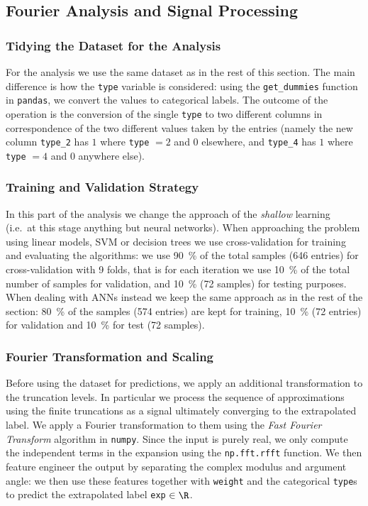 \subsection{Fourier Analysis and Signal Processing}


\subsubsection{Tidying the Dataset for the Analysis}

For the analysis we use the same dataset as in the rest of this section.
The main difference is how the \texttt{type} variable is considered: using the \texttt{get\_dummies} function in \texttt{pandas}, we convert the values to categorical labels.
The outcome of the operation is the conversion of the single \texttt{type} to two different columns in correspondence of the two different values taken by the entries (namely the new column \texttt{type\_2} has $1$ where \texttt{type} $= 2$ and $0$ elsewhere, and \texttt{type\_4} has $1$ where \texttt{type} $= 4$ and $0$ anywhere else).


\subsubsection{Training and Validation Strategy}

In this part of the analysis we change the approach of the \emph{shallow} learning (i.e.\ at this stage anything but neural networks).
When approaching the problem using linear models, SVM or decision trees we use cross-validation for training and evaluating the algorithms: we use \SI{90}{\percent} of the total samples (\num{646} entries) for cross-validation with \num{9} folds, that is for each iteration we use \SI{10}{\percent} of the total number of samples for validation, and \SI{10}{\percent} (\num{72} samples) for testing purposes.
When dealing with ANNs instead we keep the same approach as in the rest of the section: \SI{80}{\percent} of the samples (\num{574} entries) are kept for training, \SI{10}{\percent} (\num{72} entries) for validation and \SI{10}{\percent} for test (\num{72} samples).


\subsubsection{Fourier Transformation and Scaling}

Before using the dataset for predictions, we apply an additional transformation to the truncation levels.\footnotemark{}
In particular we process the sequence of approximations using the finite truncations as a signal ultimately converging to the extrapolated label.
We apply a Fourier transformation to them using the \emph{Fast Fourier Transform} algorithm in \texttt{numpy}.
Since the input is purely real, we only compute the independent terms in the expansion using the \texttt{np.fft.rfft} function.
We then feature engineer the output by separating the complex modulus and argument angle: we then use these features together with \texttt{weight} and the categorical \texttt{type}s to predict the extrapolated label \texttt{exp} $\in \R$.

